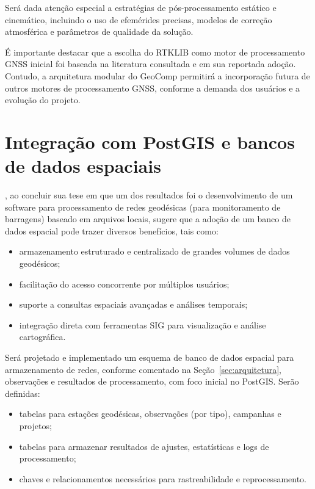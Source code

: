 \documentclass[
        12pt,                           %
        openright,                      %
        oneside,
        a4paper,                        %
        chapter=TITLE,         %
        section=TITLE,         %
        subsection=Title,      %
        english,                        %
        portugues,                      %
        ]{abntex2}
\begin{document}
Será dada atenção especial a estratégias de pós-processamento estático e cinemático, incluindo o uso de efemérides precisas, modelos de correção atmosférica e parâmetros de qualidade da solução.

É importante destacar que a escolha do RTKLIB como motor de processamento GNSS inicial foi baseada na literatura consultada e em sua reportada adoção. Contudo, a arquitetura modular do GeoComp permitirá a incorporação futura de outros motores de processamento GNSS, conforme a demanda dos usuários e a evolução do projeto.


\section{Integração com PostGIS e bancos de dados espaciais}


, ao concluir sua tese em que um dos resultados foi o desenvolvimento de um software para processamento de redes geodésicas (para monitoramento de barragens) baseado em arquivos locais, sugere que a adoção de um banco de dados espacial pode trazer diversos benefícios, tais como:
\begin{itemize}
    \item armazenamento estruturado e centralizado de grandes volumes de dados geodésicos;
    \item facilitação do acesso concorrente por múltiplos usuários;
    \item suporte a consultas espaciais avançadas e análises temporais;
    \item integração direta com ferramentas SIG para visualização e análise cartográfica.
\end{itemize}

Será projetado e implementado um esquema de banco de dados espacial para armazenamento de redes, conforme comentado na Seção~\ref{sec:arquitetura}, observações e resultados de processamento, com foco inicial no PostGIS. Serão definidas:

\begin{itemize}
    \item tabelas para estações geodésicas, observações (por tipo), campanhas e projetos;
    \item tabelas para armazenar resultados de ajustes, estatísticas e logs de processamento;
    \item chaves e relacionamentos necessários para rastreabilidade e reprocessamento.
\end{itemize}
\end{document}
